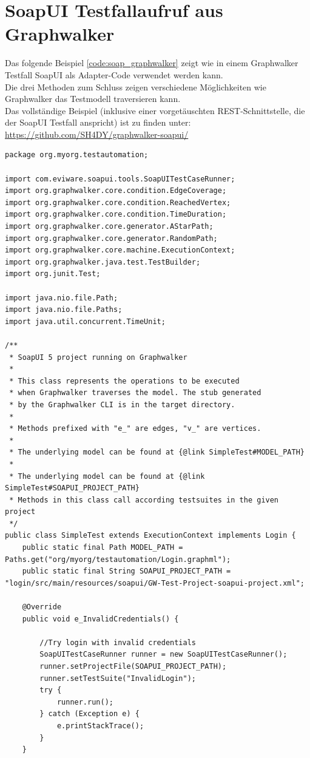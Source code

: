 \section{SoapUI Testfallaufruf aus Graphwalker}
\label{app:soap}
Das folgende Beispiel \ref{code:soap_graphwalker} zeigt wie in einem Graphwalker Testfall SoapUI als Adapter-Code verwendet werden kann.\\
Die drei Methoden zum Schluss zeigen verschiedene Möglichkeiten wie Graphwalker das Testmodell traversieren kann.\\
Das vollständige Beispiel (inklusive einer vorgetäuschten REST-Schnittstelle, die der SoapUI Testfall anspricht) ist zu finden unter: \url{https://github.com/SH4DY/graphwalker-soapui/}


\begin{lstlisting}[caption=SimpleTest.java, label=code:soap_graphwalker]
package org.myorg.testautomation;

import com.eviware.soapui.tools.SoapUITestCaseRunner;
import org.graphwalker.core.condition.EdgeCoverage;
import org.graphwalker.core.condition.ReachedVertex;
import org.graphwalker.core.condition.TimeDuration;
import org.graphwalker.core.generator.AStarPath;
import org.graphwalker.core.generator.RandomPath;
import org.graphwalker.core.machine.ExecutionContext;
import org.graphwalker.java.test.TestBuilder;
import org.junit.Test;

import java.nio.file.Path;
import java.nio.file.Paths;
import java.util.concurrent.TimeUnit;

/**
 * SoapUI 5 project running on Graphwalker
 *
 * This class represents the operations to be executed
 * when Graphwalker traverses the model. The stub generated
 * by the Graphwalker CLI is in the target directory.
 *
 * Methods prefixed with "e_" are edges, "v_" are vertices.
 *
 * The underlying model can be found at {@link SimpleTest#MODEL_PATH}
 *
 * The underlying model can be found at {@link SimpleTest#SOAPUI_PROJECT_PATH}
 * Methods in this class call according testsuites in the given project
 */
public class SimpleTest extends ExecutionContext implements Login {
    public static final Path MODEL_PATH = Paths.get("org/myorg/testautomation/Login.graphml");
    public static final String SOAPUI_PROJECT_PATH = "login/src/main/resources/soapui/GW-Test-Project-soapui-project.xml";

    @Override
    public void e_InvalidCredentials() {

        //Try login with invalid credentials
        SoapUITestCaseRunner runner = new SoapUITestCaseRunner();
        runner.setProjectFile(SOAPUI_PROJECT_PATH);
        runner.setTestSuite("InvalidLogin");
        try {
            runner.run();
        } catch (Exception e) {
            e.printStackTrace();
        }
    }


\end{lstlisting}
